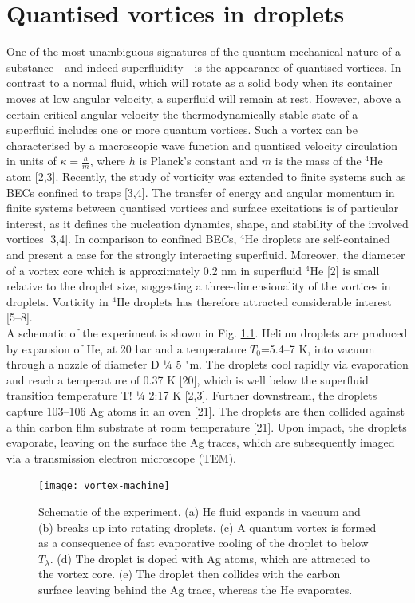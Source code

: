 \chapter{Quantised vortices in droplets}
	One of the most unambiguous signatures of the quantum mechanical nature of a substance---and indeed superfluidity---is the appearance of quantised vortices. In contrast to a normal fluid, which will rotate as a solid body when its container moves at low angular velocity, a superfluid will remain at rest. However, above a certain critical angular velocity the thermodynamically stable state of a superfluid includes one or more quantum vortices. Such a vortex can be characterised by a macroscopic wave function and quantised velocity circulation in units of $\kappa=\frac{h}{m}$, where $h$ is Planck’s constant and $m$ is the mass of the $^4$He atom [2,3]. Recently, the study of vorticity was extended to finite systems such as BECs confined to traps [3,4]. The transfer of energy and angular momentum in finite systems between quantised vortices and surface excitations is of particular interest, as it defines the nucleation dynamics, shape, and stability of the involved vortices [3,4]. In comparison to confined BECs, $^4$He droplets are self-contained and present a case for the strongly interacting superfluid. Moreover, the diameter of a vortex core which is approximately 0.2 nm in superfluid $^4$He [2] is small relative to the droplet size, suggesting a three-dimensionality of the vortices in droplets. Vorticity in $^4$He droplets has therefore attracted considerable interest [5–8].\\
	
	A schematic of the experiment is shown in Fig. \ref{fig:vortex-machine}. Helium droplets are produced by expansion of He, at 20 bar and a temperature $T_0$=5.4--7 K, into vacuum through a nozzle of diameter D 1⁄4 5 "m. The droplets cool rapidly via evaporation and reach a temperature of 0.37 K [20], which is well below the superfluid transition temperature T! 1⁄4 2:17 K [2,3]. Further downstream, the droplets capture 103–106 Ag atoms in an oven [21]. The droplets are then collided against a thin carbon film substrate at room temperature [21]. Upon impact, the droplets evaporate, leaving on the surface the Ag traces, which are subsequently imaged via a transmission electron microscope (TEM).
	\begin{figure}[t]
		\begin{center}
			\texttt{[image: vortex-machine]}
			\caption{Schematic of the experiment. (a) He fluid expands in vacuum and (b) breaks up into rotating droplets. (c) A quantum vortex is formed as a consequence of fast evaporative cooling of the droplet to below $T_\lambda$. (d) The droplet is doped with Ag atoms, which are attracted to the vortex core. (e) The droplet then collides with the carbon surface leaving behind the Ag trace, whereas the He evaporates.}
			\label{fig:vortex-machine}
		\end{center}
	\end{figure}	
	
